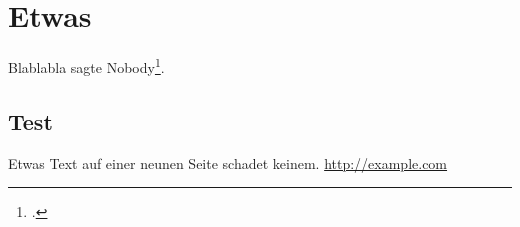 \documentclass[
    paper    = A4,
    fontsize = 12pt,
]{scrreport}
\begin{document}
    \chapter{Etwas}

    Blablabla sagte Nobody\footcite[siehe S. 32]{Nobody06}.
    
    \newpage
    \section{Test}

    Etwas Text auf einer neunen Seite schadet keinem.
    \url{http://example.com}

    \newpage
    \printbibliography
\end{document}
